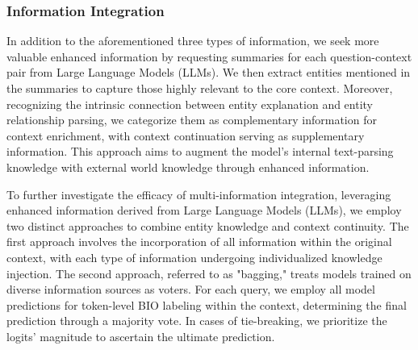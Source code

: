 \subsubsection{Information Integration}
\label{sec:information_integration}
In addition to the aforementioned three types of information, we seek more valuable enhanced information by requesting summaries for each question-context pair from Large Language Models (LLMs). We then extract entities mentioned in the summaries to capture those highly relevant to the core context. Moreover, recognizing the intrinsic connection between entity explanation and entity relationship parsing, we categorize them as complementary information for context enrichment, with context continuation serving as supplementary information. This approach aims to augment the model's internal text-parsing knowledge with external world knowledge through enhanced information. 

To further investigate the efficacy of multi-information integration, leveraging enhanced information derived from Large Language Models (LLMs), we employ two distinct approaches to combine entity knowledge and context continuity. The first approach involves the incorporation of all information within the original context, with each type of information undergoing individualized knowledge injection. The second approach, referred to as "bagging," treats models trained on diverse information sources as voters. For each query, we employ all model predictions for token-level BIO labeling within the context, determining the final prediction through a majority vote. In cases of tie-breaking, we prioritize the logits' magnitude to ascertain the ultimate prediction.

